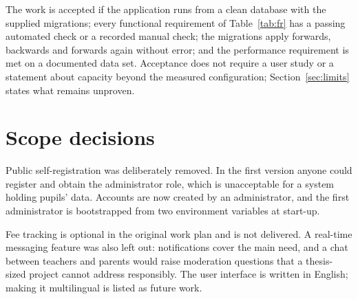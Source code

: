 The work is accepted if the application runs from a clean database with the supplied migrations; every functional requirement of Table~\ref{tab:fr} has a passing automated check or a recorded manual check; the migrations apply forwards, backwards and forwards again without error; and the performance requirement is met on a documented data set. Acceptance does not require a user study or a statement about capacity beyond the measured configuration; Section~\ref{sec:limits} states what remains unproven.

\section{Scope decisions}

Public self-registration was deliberately removed. In the first version anyone could register and obtain the administrator role, which is unacceptable for a system holding pupils' data. Accounts are now created by an administrator, and the first administrator is bootstrapped from two environment variables at start-up.

Fee tracking is optional in the original work plan and is not delivered. A real-time messaging feature was also left out: notifications cover the main need, and a chat between teachers and parents would raise moderation questions that a thesis-sized project cannot address responsibly. The user interface is written in English; making it multilingual is listed as future work.
